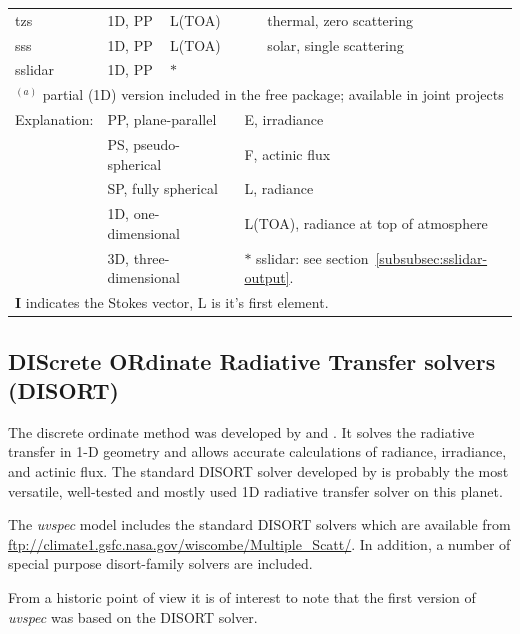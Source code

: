 \begin{table}[htbp]
\begin{tabularx}{1.0\hsize}{lp{1.5cm}lp{4cm}X}
    tzs        & 1D, PP & L(TOA)          &                      & thermal, zero scattering \\
    sss        & 1D, PP & L(TOA)          &                      & solar, single scattering \\
    sslidar    & 1D, PP & $\ast$          &                      & \\
    \hline
    \multicolumn{5}{l}{$^{(a)}$ partial (1D) version included in the free package; available in joint projects}\\
    Explanation: & \multicolumn{2}{l}{PP, plane-parallel}    & \multicolumn{2}{l}{E, irradiance}   \\
    & \multicolumn{2}{l}{PS, pseudo-spherical}  & \multicolumn{2}{l}{F, actinic flux} \\
    & \multicolumn{2}{l}{SP, fully spherical}   & \multicolumn{2}{l}{L, radiance}    \\
 & \multicolumn{2}{l}{1D, one-dimensional}   &
      \multicolumn{2}{l}{L(TOA), radiance at top of atmosphere}   \\
    & \multicolumn{2}{l}{3D, three-dimensional} & \multicolumn{2}{l}{$\ast$ sslidar: see section~\ref{subsubsec:sslidar-output}.} \\
    \multicolumn{5}{l}{{\bf I} indicates the Stokes vector, L is it's
      first element.}\\
  \end{tabularx}
\end{table} 

\subsection{DIScrete ORdinate Radiative Transfer solvers (DISORT)}
The discrete ordinate method was developed by \citet{chand60}
and \citet{Stamnes1988c}.  It solves the radiative transfer
in 1-D geometry and allows accurate calculations of radiance,
irradiance, and actinic flux. The standard DISORT solver developed 
by \citet{Stamnes1988c,stamnes2000} is probably the most versatile, well-tested
and mostly used 1D radiative transfer solver on this planet.

The {\sl uvspec} model includes the standard
DISORT solvers which are available from
\url{ftp://climate1.gsfc.nasa.gov/wiscombe/Multiple_Scatt/}. In
addition, a number of special purpose disort-family solvers are included.

From a historic point of view it is of interest to note that the
first version of {\sl uvspec} was based on the DISORT solver.

